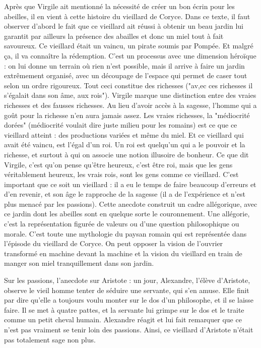 \documentclass[a4paper,12pt]{book}
\begin{document}
\par Après que Virgile ait mentionné la nécessité de créer un bon écrin pour les abeilles, il en vient à cette histoire du vieillard de Coryce. Dans ce texte, il faut observer d'abord le fait que ce vieillard ait réussi à obtenir un beau jardin lui garantit par ailleurs la présence des abailles et donc un miel tout à fait savoureux. Ce vieillard était un vaincu, un pirate soumis par Pompée. Et malgré ça, il va connaître la rédemption. C'est un processus avec une dimension héroïque : on lui donne un terrain où rien n'est possible, mais il arrive à faire un jardin extrêmement organisé, avec un découpage de l'espace qui permet de caser tout selon un ordre rigoureux. Tout ceci constitue des richesses ("av,ec ces richesses il s'égalait dans son âme, aux rois"). Virgile marque une distinction entre des vraies richesses et des fausses richesses. Au lieu d'avoir accès à la sagesse, l'homme qui a goût pour la richesse n'en aura jamais assez. Les vraies richesses, la "médiocrité dorées" (médiocrité voulait dire juste milieu pour les romains) est ce que ce vieillard atteint : des productions variées et même du miel. Et ce vieillard qui avait été vaincu, est l'égal d'un roi. Un roi est quelqu'un qui a le pouvoir et la richesse, et surtout à qui on associe une notion illusoire de bonheur. Ce que dit Virgile, c'est qu'on pense qu'être heureux, c'est être roi, mais que les gens véritablement heureux, les vrais rois, sont les gens comme ce vieillard. C'est important que ce soit un vieillard : il a eu le temps de faire beaucoup d'erreurs et d'en revenir, et son âge le rapproche de la sagesse (il a de l'expérience et n'est plus menacé par les passions). Cette anecdote construit un cadre allégorique, avec ce jardin dont les abeilles sont en quelque sorte le couronnement. Une allégorie, c'est la représentation figurée de valeurs ou d'une question philosophique ou morale. C'est toute une mythologie du paysan romain qui est représentée dans l'épisode du vieillard de Coryce. On peut opposer la vision de l'ouvrier transformé en machine devant la machine et la vision du vieillard en train de manger son miel tranquillement dans son jardin.
\par Sur les passions, l'anecdote sur Aristote : un jour, Alexandre, l'élève d'Aristote, observe le vieil homme tenter de séduire une servante, qui s'en amuse. Elle finit par dire qu'elle a toujours voulu monter sur le dos d'un philosophe, et il se laisse faire. Il se met à quatre pattes, et la servante lui grimpe sur le dos et le traite comme un petit cheval humain. Alexandre réagit et lui fait remarquer que ce n'est pas vraiment se tenir loin des passions. Ainsi, ce vieillard d'Aristote n'était pas totalement sage non plus.
\end{document}
